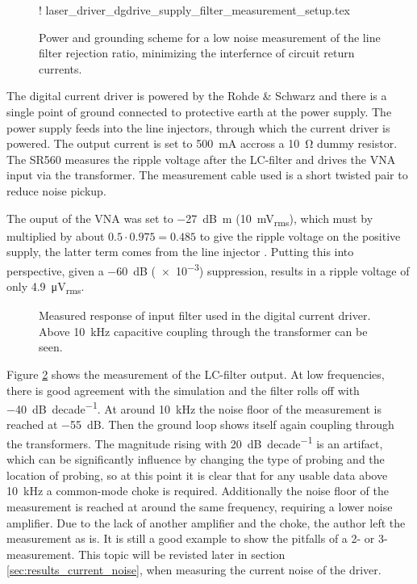 \begin{figure}[ht]
    \centering
    \resizebox {0.9\textwidth} {!} {
        {laser_driver_dgdrive_supply_filter_measurement_setup.tex}
    } %
    \caption{Power and grounding scheme for a low noise measurement of the line filter rejection ratio, minimizing the interfernce of circuit return currents.}
    \label{fig:laser_driver_supply_filter_measurement}
\end{figure}

The digital current driver is powered by the Rohde \& Schwarz  and there is a single point of ground connected to protective earth at the power supply. The power supply feeds into the line injectors, through which the current driver is powered. The output current is set to \qty{500}{\mA} accross a \qty{10}{\ohm} dummy resistor. The SR560 measures the ripple voltage after the LC-filter and drives the VNA input via the transformer. The measurement cable used is a short  twisted pair to reduce noise pickup.

The ouput of the VNA was set to \qty{-27}{\dB m} (\qty{10}{\mV_{rms}}), which must by multiplied by about $0.5 \cdot 0.975 = 0.485$ to give the ripple voltage on the positive supply, the latter term comes from the line injector \cite{line_injector_github}. Putting this into perspective, given a \qty{-60}{\dB} (\num{e-3}) suppression, results in a ripple voltage of only \qty{4.9}{\uV_{rms}}.

\begin{figure}[ht]
    \centering
    
    \caption{Measured response of input filter used in the digital current driver. Above \qty{10}{\kHz} capacitive coupling through the transformer can be seen.}
    \label{fig:laser_driver_input_filter}
\end{figure}

Figure \ref{fig:laser_driver_input_filter} shows the measurement of the LC-filter output. At low frequencies, there is good agreement with the simulation and the filter rolls off with \qty{-40}{\dB \per decade}. At around \qty{10}{\kHz} the noise floor of the measurement is reached at \qty{-55}{\dB}. Then the ground loop shows itself again coupling through the transformers. The magnitude rising with \qty{20}{\dB \per decade} is an artifact, which can be significantly influence by changing the type of probing and the location of probing, so at this point it is clear that for any usable data above \qty{10}{\kHz} a common-mode choke is required. Additionally the noise floor of the measurement is reached at around the same frequency, requiring a lower noise amplifier. Due to the lack of another amplifier and the choke, the author left the measurement as is. It is still a good example to show the pitfalls of a 2- or 3- measurement. This topic will be revisted later in section \ref{sec:results_current_noise}, when measuring the current noise of the driver.

